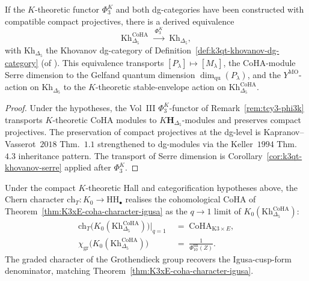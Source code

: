 \begin{corollary}
\label{cor:tcy3-khovanov-coha-equivalence}
If the $K$-theoretic functor $\Phi_3^K$ and both dg-categories have
been constructed with compatible compact projectives, there is a
derived equivalence
\[
 \mathrm{Kh}_{\Delta_5}^{\mathrm{CoHA}}
 \;\xrightarrow{\;\Phi_3^K\;}\;
 \mathrm{Kh}_{\Delta_5},
\]
with $\mathrm{Kh}_{\Delta_5}$ the Khovanov dg-category of
Definition~\ref{def:k3qt-khovanov-dg-category} (of
\cite{VolI}). This equivalence
transports $[P_\lambda]\mapsto [M_\lambda]$, the CoHA-module Serre
dimension to the Gelfand quantum dimension
$\dim_{\mathrm{qu}}(P_\lambda)$, and the $Y^{\mathrm{MO}}$-action on
$\mathrm{Kh}_{\Delta_5}$ to the $K$-theoretic stable-envelope
action on $\mathrm{Kh}_{\Delta_5}^{\mathrm{CoHA}}$.
\end{corollary}

\begin{proof}
Under the hypotheses, the Vol~III $\Phi_3^K$-functor of
Remark~\ref{rem:tcy3-phi3k} transports $K$-theoretic CoHA modules to
$K\mathbf H_{\Delta_5}$-modules and preserves compact projectives. The
preservation of compact
projectives at the dg-level is Kapranov--Vasserot~$2018$
Thm.\ $1.1$ strengthened to dg-modules via the Keller~$1994$
Thm.\ $4.3$ inheritance pattern. The transport of Serre
dimension is Corollary~\ref{cor:k3qt-khovanov-serre}
applied after $\Phi_3^K$.
\end{proof}

\begin{theorem}
\label{thm:tcy3-khovanov-cohomological-limit}
Under the compact $K$-theoretic Hall and categorification hypotheses
above, the Chern character $\mathrm{ch}_T\colon K_0 \to
\mathrm{HH}_\bullet$
realises the cohomological CoHA of
Theorem~\ref{thm:K3xE-coha-character-igusa} as the $q\to 1$
limit of $K_0(\mathrm{Kh}_{\Delta_5}^{\mathrm{CoHA}})$:
\begin{align*}
 \mathrm{ch}_T\bigl(K_0(\mathrm{Kh}_{\Delta_5}^{\mathrm{CoHA}})\bigr)
 \bigl|_{q = 1}
 &\;=\;
 \mathrm{CoHA}_{\mathrm{K3}\times E}, \\
 \chi_{\mathrm{gr}}\bigl(K_0(\mathrm{Kh}_{\Delta_5}^{\mathrm{CoHA}})\bigr)
 &\;=\;
 \frac{1}{\Phi_{10}^{\mathrm{un}}(Z)}.
\end{align*}
The graded character of the Grothendieck group recovers the
Igusa-cusp-form denominator, matching
Theorem~\ref{thm:K3xE-coha-character-igusa}.
\end{theorem}

